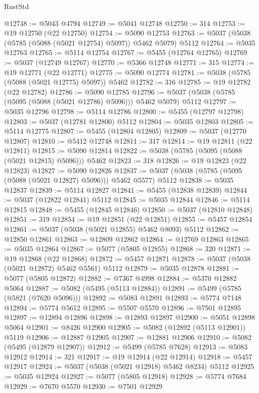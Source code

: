 \begin{lexlean}{RustStd}
\begin{coremodule}
@12748 := @5043 @4794
@12749 := @5041 @12748
@12750 := 314
@12753 := @19 @12750 (@22 @12750)
@12754 := @5090 @12753
@12763 := @5037 (@5038 (@5785 (@5088 (@5021 @12754) @5097)) @5462 @5079) @5112
@12764 := @5035 @12763
@12765 := @5114 @12754
@12767 := @5455 (@12764 @12765)
@12769 := @5037 (@12749 @12767)
@12770 := @5366 @12748
@12771 := 315
@12774 := @19 @12771 (@22 @12771)
@12775 := @5090 @12774
@12781 := @5038 (@5785 (@5088 (@5021 @12775) @5097)) @5462
@12782 := 316
@12785 := @19 @12782 (@22 @12782)
@12786 := @5090 @12785
@12796 := @5037 (@5038 (@5785 (@5095 (@5088 (@5021 @12786) @5096))) @5462 @5079) @5112
@12797 := @5035 @12796
@12798 := @5114 @12786
@12800 := @5455 (@12797 @12798)
@12803 := @5037 (@12781 @12800) @5112
@12804 := @5035 @12803
@12805 := @5114 @12775
@12807 := @5455 (@12804 @12805)
@12809 := @5037 (@12770 @12807)
@12810 := @5412 @12748
@12811 := 317
@12814 := @19 @12811 (@22 @12811)
@12815 := @5090 @12814
@12822 := @5038 (@5785 (@5095 (@5088 (@5021 @12815) @5096))) @5462
@12823 := 318
@12826 := @19 @12823 (@22 @12823)
@12827 := @5090 @12826
@12837 := @5037 (@5038 (@5785 (@5095 (@5088 (@5021 @12827) @5096))) @5462 @5577) @5112
@12838 := @5035 @12837
@12839 := @5114 @12827
@12841 := @5455 (@12838 @12839)
@12844 := @5037 (@12822 @12841) @5112
@12845 := @5035 @12844
@12846 := @5114 @12815
@12848 := @5455 (@12845 @12846)
@12850 := @5037 (@12810 @12848)
@12851 := 319
@12854 := @19 @12851 (@22 @12851)
@12855 := @5457 @12854
@12861 := @5037 (@5038 (@5021 @12855) @5462 @8093) @5112
@12862 := @12850 @12861
@12863 := @12809 @12862
@12864 := @12769 @12863
@12865 := @5035 @12864
@12867 := @5077 (@5805 @12855)
@12868 := 320
@12871 := @19 @12868 (@22 @12868)
@12872 := @5457 @12871
@12878 := @5037 (@5038 (@5021 @12872) @5462 @5561) @5112
@12879 := @5035 @12878
@12881 := @5077 (@5805 @12872)
@12882 := @7367 @4998
@12884 := @5370 @12882 @5064
@12887 := @5082 (@5495 (@5113 @12884))
@12891 := @5499 (@5785 (@5821 (@7620 @5096)))
@12892 := @5083 @12891
@12893 := @5774 @7148
@12894 := @5774 @5612
@12895 := @5507 @5570
@12896 := @7501 @12895
@12897 := @12894 @12896
@12898 := @12893 @12897
@12900 := @5051 @12898 @5064
@12901 := @8426 @12900
@12905 := @5082 (@12892 (@5113 @12901)) @5119
@12906 := @12887 @12905
@12907 := @12881 @12906
@12910 := @5082 (@5495 (@12879 @12907))
@12912 := @5499 (@5785 @7628)
@12913 := @5083 @12912
@12914 := 321
@12917 := @19 @12914 (@22 @12914)
@12918 := @5457 @12917
@12924 := @5037 (@5038 (@5021 @12918) @5462 @8234) @5112
@12925 := @5035 @12924
@12927 := @5077 (@5805 @12918)
@12928 := @5774 @7684
@12929 := @7670 @5570
@12930 := @7501 @12929

\end{coremodule}
\end{lexlean}
